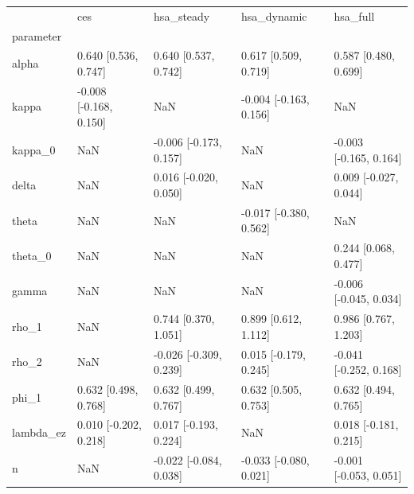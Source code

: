 \begin{tabular}{lllll}
\toprule
 & ces & hsa\_steady & hsa\_dynamic & hsa\_full \\
parameter &  &  &  &  \\
\midrule
alpha & 0.640 [0.536, 0.747] & 0.640 [0.537, 0.742] & 0.617 [0.509, 0.719] & 0.587 [0.480, 0.699] \\
kappa & -0.008 [-0.168, 0.150] & NaN & -0.004 [-0.163, 0.156] & NaN \\
kappa\_0 & NaN & -0.006 [-0.173, 0.157] & NaN & -0.003 [-0.165, 0.164] \\
delta & NaN & 0.016 [-0.020, 0.050] & NaN & 0.009 [-0.027, 0.044] \\
theta & NaN & NaN & -0.017 [-0.380, 0.562] & NaN \\
theta\_0 & NaN & NaN & NaN & 0.244 [0.068, 0.477] \\
gamma & NaN & NaN & NaN & -0.006 [-0.045, 0.034] \\
rho\_1 & NaN & 0.744 [0.370, 1.051] & 0.899 [0.612, 1.112] & 0.986 [0.767, 1.203] \\
rho\_2 & NaN & -0.026 [-0.309, 0.239] & 0.015 [-0.179, 0.245] & -0.041 [-0.252, 0.168] \\
phi\_1 & 0.632 [0.498, 0.768] & 0.632 [0.499, 0.767] & 0.632 [0.505, 0.753] & 0.632 [0.494, 0.765] \\
lambda\_ez & 0.010 [-0.202, 0.218] & 0.017 [-0.193, 0.224] & NaN & 0.018 [-0.181, 0.215] \\
n & NaN & -0.022 [-0.084, 0.038] & -0.033 [-0.080, 0.021] & -0.001 [-0.053, 0.051] \\
\bottomrule
\end{tabular}
